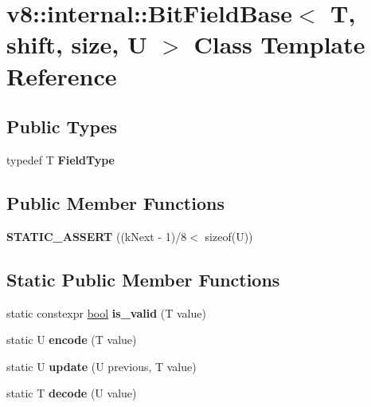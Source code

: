 \hypertarget{classv8_1_1internal_1_1BitFieldBase}{}\section{v8\+:\+:internal\+:\+:Bit\+Field\+Base$<$ T, shift, size, U $>$ Class Template Reference}
\label{classv8_1_1internal_1_1BitFieldBase}
\subsection*{Public Types}
\begin{DoxyCompactItemize}
\item 
\mbox{\label{classv8_1_1internal_1_1BitFieldBase_a06a0c16b444a78eb7f09e1e781c73558}} 
typedef T {\bfseries Field\+Type}
\end{DoxyCompactItemize}
\subsection*{Public Member Functions}
\begin{DoxyCompactItemize}
\item 
\mbox{\label{classv8_1_1internal_1_1BitFieldBase_aeee6b2945715e8ed16409869410cbb57}} 
{\bfseries S\+T\+A\+T\+I\+C\+\_\+\+A\+S\+S\+E\+RT} ((k\+Next -\/ 1)/8$<$ sizeof(U))
\end{DoxyCompactItemize}
\subsection*{Static Public Member Functions}
\begin{DoxyCompactItemize}
\item 
\mbox{\label{classv8_1_1internal_1_1BitFieldBase_a2b3c045a3f940e2a1db21c1db2719b07}} 
static constexpr \mbox{\hyperlink{classbool}{bool}} {\bfseries is\+\_\+valid} (T value)
\item 
\mbox{\label{classv8_1_1internal_1_1BitFieldBase_aa162659173f7f724b50e31d89c0f3fa8}} 
static U {\bfseries encode} (T value)
\item 
\mbox{\label{classv8_1_1internal_1_1BitFieldBase_a0ce53f2db72ce51d96606fc0c9f353db}} 
static U {\bfseries update} (U previous, T value)
\item 
\mbox{\label{classv8_1_1internal_1_1BitFieldBase_aa251f75c99718dea15a4f90ad42db161}} 
static T {\bfseries decode} (U value)
\end{DoxyCompactItemize}
